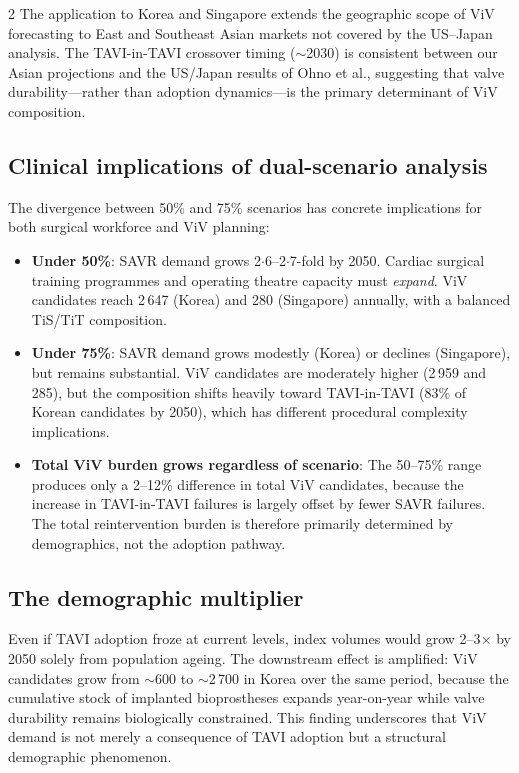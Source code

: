 \documentclass[10pt, a4paper]{article}
\begin{document}
\begin{multicols}{2}
The application to Korea and Singapore extends the geographic scope of ViV forecasting to East and Southeast Asian markets not covered by the US--Japan analysis. The TAVI-in-TAVI crossover timing ($\sim$2030) is consistent between our Asian projections and the US/Japan results of Ohno et al., suggesting that valve durability---rather than adoption dynamics---is the primary determinant of ViV composition.

\subsection{Clinical implications of dual-scenario analysis}

The divergence between 50\% and 75\% scenarios has concrete implications for both surgical workforce and ViV planning:

\begin{itemize}[leftmargin=*, itemsep=4pt]
    \item \textbf{Under 50\%}: SAVR demand grows 2$\cdot$6--2$\cdot$7-fold by 2050. Cardiac surgical training programmes and operating theatre capacity must \emph{expand}. ViV candidates reach 2\,647 (Korea) and 280 (Singapore) annually, with a balanced TiS/TiT composition.
    \item \textbf{Under 75\%}: SAVR demand grows modestly (Korea) or declines (Singapore), but remains substantial. ViV candidates are moderately higher (2\,959 and 285), but the composition shifts heavily toward TAVI-in-TAVI (83\% of Korean candidates by 2050), which has different procedural complexity implications.
    \item \textbf{Total ViV burden grows regardless of scenario}: The 50--75\% range produces only a 2--12\% difference in total ViV candidates, because the increase in TAVI-in-TAVI failures is largely offset by fewer SAVR failures. The total reintervention burden is therefore primarily determined by demographics, not the adoption pathway.
\end{itemize}

\subsection{The demographic multiplier}

Even if TAVI adoption froze at current levels, index volumes would grow 2--3$\times$ by 2050 solely from population ageing. The downstream effect is amplified: ViV candidates grow from $\sim$600 to $\sim$2\,700 in Korea over the same period, because the cumulative stock of implanted bioprostheses expands year-on-year while valve durability remains biologically constrained. This finding underscores that ViV demand is not merely a consequence of TAVI adoption but a structural demographic phenomenon.


\end{multicols}
\end{document}
